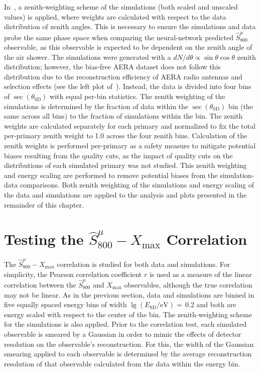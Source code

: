In~, a zenith-weighting scheme of the simulations (both scaled and unscaled values) is applied, where weights are calculated with respect to the data distribution of zenith angles.
This is necessary to ensure the simulations and data probe the same phase space when comparing the neural-network predicted $\hat{S}^{\mu}_{800}$ observable, as this observable is expected to be dependent on the zenith angle of the air shower.
The simulations were generated with a $dN/d\theta \propto \sin\theta\cos\theta$ zenith distribution; however, the bias-free AERA dataset does not follow this distribution due to the reconstruction efficiency of AERA radio antennas and selection effects (see the left plot of~).
Instead, the data is divided into four bins of $\sec\left(\theta_{\text{SD}}\right)$ with equal per-bin statistics.
The zenith weighting of the simulations is determined by the fraction of data within the $\sec\left(\theta_{\text{SD}}\right)$ bin (the same across all bins) to the fraction of simulations within the bin.
The zenith weights are calculated separately for each primary and normalized to fix the total per-primary zenith weight to 1.0 across the four zenith bins.
Calculation of the zenith weights is performed per-primary as a safety measure to mitigate potential biases resulting from the quality cuts, as the impact of quality cuts on the distributions of each simulated primary was not studied.
This zenith weighting and energy scaling are performed to remove potential biases from the simulation-data comparisons.
Both zenith weighting of the simulations and energy scaling of the data and simulations are applied to the analysis and plots presented in the remainder of this chapter.


\section{Testing the \texorpdfstring{$\hat{S}^{\mu}_{800}-X_{\text{max}}$}{hatS--Xmax} Correlation}\label{sec:pearson}


The $\hat{S}^{\mu}_{800}-X_{\text{max}}$ correlation is studied for both data and simulations.
For simplicity, the Pearson correlation coefficient $r$ is used as a measure of the linear correlation between the $\hat{S}^{\mu}_{800}$ and $X_{\text{max}}$ observables, although the true correlation may not be linear.
As in the previous section, data and simulations are binned in five equally spaced energy bins of width $\lg\left(E_{\text{SD}} / \text{eV}\right)=$\,0.2 and both are energy scaled with respect to the center of the bin.
The zenith-weighting scheme for the simulations is also applied.
Prior to the correlation test, each simulated observable is smeared by a Gaussian in order to mimic the effects of detector resolution on the observable's reconstruction.
For this, the width of the Gaussian smearing applied to each observable is determined by the average reconstruction resolution of that observable calculated from the data within the energy bin.

